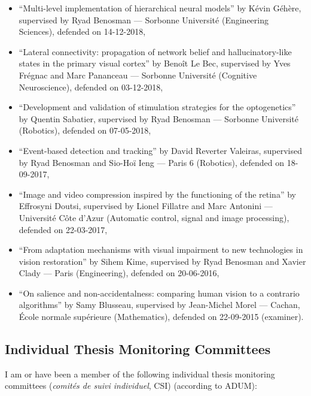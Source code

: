 \documentclass[10pt,english,a4paper,oneside]{article}%
\begin{document}
\begin{itemize}
	\item ``Multi-level implementation of hierarchical neural models'' by Kévin Géhère, supervised by Ryad Benosman --- Sorbonne Université (Engineering Sciences), defended on 14-12-2018,

	\item ``Lateral connectivity: propagation of network belief and hallucinatory-like states in the primary visual cortex'' by Benoît Le Bec, supervised by Yves Frégnac and Marc Pananceau --- Sorbonne Université (Cognitive Neuroscience), defended on 03-12-2018,

	\item ``Development and validation of stimulation strategies for the optogenetics'' by Quentin Sabatier, supervised by Ryad Benosman --- Sorbonne Université (Robotics), defended on 07-05-2018,

	\item ``Event-based detection and tracking'' by David Reverter Valeiras, supervised by Ryad Benosman and Sio-Hoï Ieng --- Paris 6 (Robotics), defended on 18-09-2017,

	\item ``Image and video compression inspired by the functioning of the retina''	by Effrosyni Doutsi, supervised by Lionel Fillatre and Marc Antonini --- Université Côte d'Azur (Automatic control, signal and image processing), defended on 22-03-2017,

	\item ``From adaptation mechanisms with visual impairment to new technologies in vision restoration'' by Sihem Kime, supervised by Ryad Benosman and Xavier Clady --- Paris (Engineering), defended on 20-06-2016,

	\item ``On salience and non-accidentalness: comparing human vision to a contrario algorithms''  by Samy Blusseau, supervised by Jean-Michel Morel --- Cachan, École normale supérieure (Mathematics), defended on 22-09-2015 (examiner).
\end{itemize} %


\subsection{Individual Thesis Monitoring Committees} %

I am or have been a member of the following individual thesis monitoring committees (\emph{comités de suivi individuel}, CSI) (according to ADUM):
\end{document}
